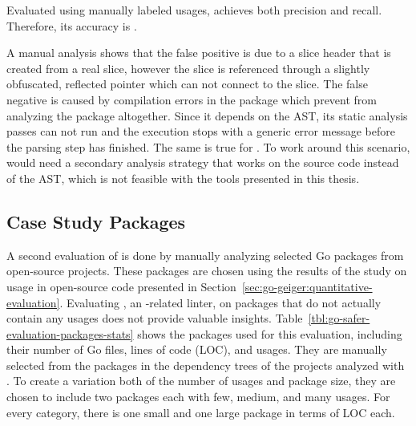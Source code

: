 \begin{hero}
    Evaluated using manually labeled \unsafe{} usages, \toolSafer{} achieves both  precision and
    recall.
    Therefore, its accuracy is .
\end{hero}

A manual analysis shows that the  false positive is due to a slice header that is created from a real
slice, however the slice is referenced through a slightly obfuscated, reflected pointer which \toolSafer{} can not
connect to the slice.
The false negative is caused by compilation errors in the package which prevent \toolSafer{} from analyzing the package
altogether.
Since it depends on the \acrshort{AST}, its static analysis passes can not run and the execution stops with a generic
error message before the parsing step has finished.
The same is true for \toolGosec{}.
To work around this scenario, \toolSafer{} would need a secondary analysis strategy that works on the source code
instead of the \acrshort{AST}, which is not feasible with the tools presented in this thesis.



\subsection{Case Study Packages}\label{subsec:go-safer:evaluation:case-studies}

A second evaluation of \toolSafer{} is done by manually analyzing  selected Go packages from open-source
projects.
These packages are chosen using the results of the study on \unsafe{} usage in open-source code presented in
Section~\ref{sec:go-geiger:quantitative-evaluation}.
Evaluating \toolSafer{}, an \unsafe{}-related linter, on packages that do not actually contain any \unsafe{} usages does
not provide valuable insights.
Table~\ref{tbl:go-safer-evaluation-packages-stats} shows the  packages used for this evaluation, including
their number of Go files, lines of code (\acrshort{LOC}), and \unsafe{} usages.
They are manually selected from the packages in the dependency trees of the projects analyzed with \toolGeiger{}.
To create a variation both of the number of \unsafe{} usages and package size, they are chosen to include two packages
each with few, medium, and many \unsafe{} usages.
For every category, there is one small and one large package in terms of \acrshort{LOC} each.

